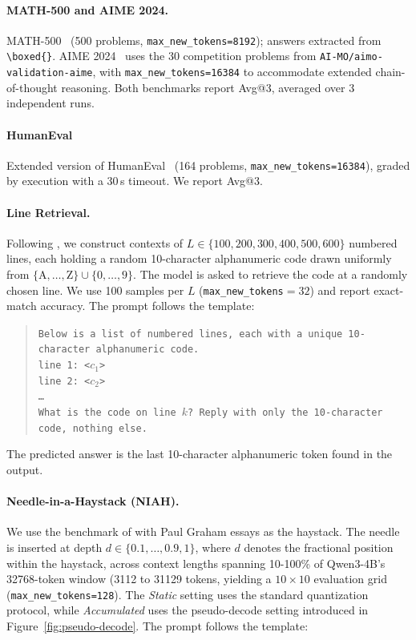 \documentclass{llmxive}
\begin{document}
\paragraph{MATH-500 and AIME 2024.}
MATH-500~\citep{lightman2024lets_math500} (500 problems, \texttt{max\_new\_tokens=8192}); answers extracted from \verb|\boxed{}|. AIME 2024~\citep{aime24} uses the 30 competition problems from \texttt{AI-MO/aimo-validation-aime}, with \texttt{max\_new\_tokens=16384} to accommodate extended chain-of-thought reasoning. Both benchmarks report Avg@3, averaged over 3 independent runs.


\paragraph{HumanEval}
Extended version of HumanEval~\citep{chen2021evaluating_humaneval} (164 problems, \texttt{max\_new\_tokens=16384}), graded by execution with a 30\,s timeout. We report Avg@3.

\paragraph{Line Retrieval.}
Following \cite{li2023how_line-retrieval}, we construct contexts of $L \in \{100, 200, 300, 400, 500, 600\}$ numbered lines, each holding a random 10-character alphanumeric code drawn uniformly from $\{\mathrm{A},\dots,\mathrm{Z}\} \cup \{0,\dots,9\}$. The model is asked to retrieve the code at a randomly chosen line. We use 100 samples per $L$ (\texttt{max\_new\_tokens}$=32$) and report exact-match accuracy. The prompt follows the template:

\begin{quote}\small
\texttt{Below is a list of numbered lines, each with a unique 10-character alphanumeric code.}\\
\texttt{line 1: <$c_1$>}\\
\texttt{line 2: <$c_2$>}\\
\texttt{\ldots}\\[2pt]
\texttt{What is the code on line $k$? Reply with only the 10-character code, nothing else.}
\end{quote}

The predicted answer is the last 10-character alphanumeric token found in the output.

\paragraph{Needle-in-a-Haystack (NIAH).}
We use the benchmark of \cite{kamradt2023needle} with Paul Graham essays as the haystack. The needle is inserted at depth $d \in \{0.1, \ldots, 0.9, 1\}$, where $d$ denotes the fractional position within the haystack, across context lengths spanning 10-100\% of Qwen3-4B's \num{32768}-token window (\num{3112} to \num{31129} tokens, yielding a $10{\times}10$ evaluation grid (\texttt{max\_new\_tokens=128}). The \textit{Static} setting uses the standard quantization protocol, while \textit{Accumulated} uses the pseudo-decode setting introduced in Figure~\ref{fig:pseudo-decode}. The prompt follows the template:
\end{document}
